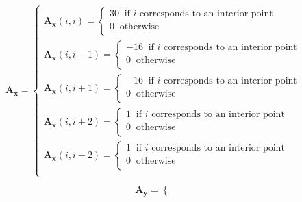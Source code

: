 \documentclass[12 pt, final]{article}
\begin{document}
\begin{itemize}
\begin{itemize}
\begin{enumerate}
        \begin{align*}
                    \mathbf{A_x} = \begin{cases}
                    \mathbf{A_x}(i,i) =
                    \begin{cases}
                    30 \: \text{ if $i$ corresponds to an interior point}\:\\
                    0 \: \text{ otherwise}\:\\
                    \end{cases}\\
                    \mathbf{A_x}(i,i-1) =
                    \begin{cases}
                    -16 \: \text{ if $i$ corresponds to an interior point}\:\\
                    0 \: \text{ otherwise}\:\\
                    \end{cases}\\
                    \mathbf{A_x}(i,i+1) =
                    \begin{cases}
                    -16 \: \text{ if $i$ corresponds to an interior point}\:\\
                    0 \: \text{ otherwise}\:\\
                    \end{cases}\\
                    \mathbf{A_x}(i,i+2) =
                    \begin{cases}
                    1 \: \text{ if $i$ corresponds to an interior point}\:\\
                    0 \: \text{ otherwise}\:\\
                    \end{cases}\\
                    \mathbf{A_x}(i,i-2) =
                    \begin{cases}
                    1 \: \text{ if $i$ corresponds to an interior point}\:\\
                    0 \: \text{ otherwise}\:\\
                    \end{cases}\\                    
                    \end{cases}\\
            \end{align*}
        \begin{align*}
                    \mathbf{A_y} = \begin{cases}

\end{cases}
\end{align*}
\end{enumerate}
\end{itemize}
\end{itemize}
\end{document}
